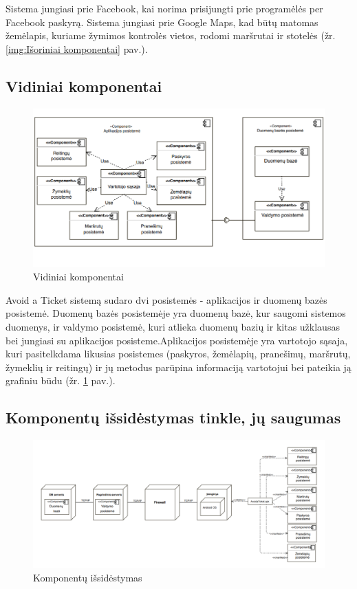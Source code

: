 \documentclass{VUMIFPSkursinis}
\begin{document}
Sistema jungiasi prie Facebook, kai norima prisijungti prie programėlės per Facebook paskyrą.
Sistema jungiasi prie Google Maps, kad būtų matomas žemėlapis, kuriame žymimos kontrolės vietos, rodomi maršrutai ir stotelės (žr. \ref{img:Išoriniai komponentai} pav.).

\subsection{Vidiniai komponentai}

\begin{figure}[H]
	\centering
	\includegraphics[scale=0.7]{img/Vidiniai_komponentai}
	\caption{Vidiniai komponentai}
	\label{img:Vidiniai komponentai}
\end{figure}

Avoid a Ticket sistemą sudaro dvi posistemės - aplikacijos ir duomenų bazės posistemė. Duomenų bazės posistemėje yra duomenų bazė, kur saugomi sistemos duomenys, ir valdymo posistemė, kuri atlieka duomenų bazių ir kitas užklausas bei jungiasi su aplikacijos posisteme.Aplikacijos posistemėje yra vartotojo sąsaja, kuri pasitelkdama likusias posistemes (paskyros, žemėlapių, pranešimų, maršrutų, žymeklių ir reitingų) ir jų metodus parūpina informaciją vartotojui bei pateikia ją grafiniu būdu (žr. \ref{img:Vidiniai komponentai} pav.).

\subsection{Komponentų išsidėstymas tinkle, jų saugumas}

\begin{figure}[H]
	\centering
	\includegraphics[scale=0.4]{img/Komponentu_issidestymas}
	\caption{Komponentų išsidėstymas}
	\label{img:išsidėstymas}
\end{figure}
\end{document}
